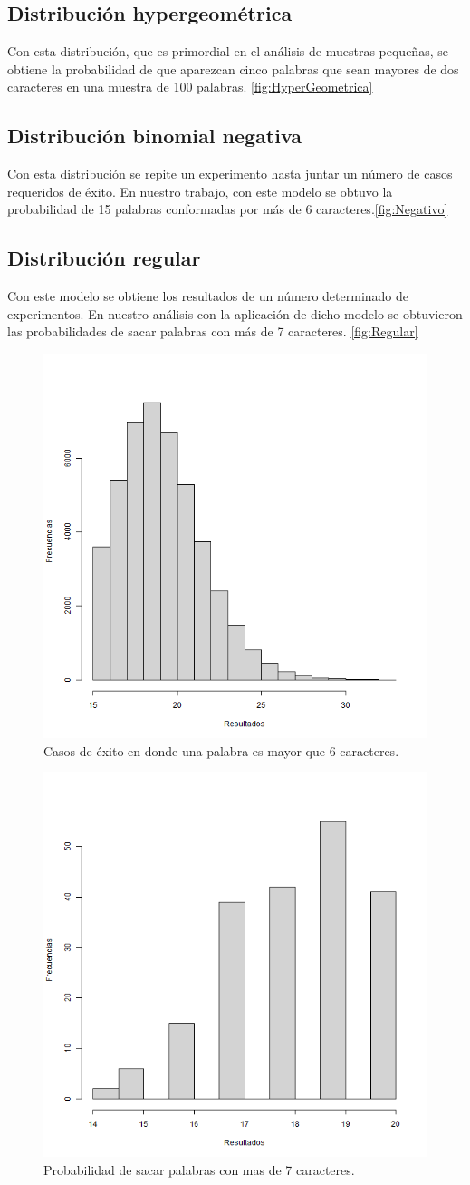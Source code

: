 \documentclass[]{article}
\begin{document}
\subsection{Distribución hypergeométrica}
Con esta distribución, que es primordial en el análisis de muestras pequeñas, se obtiene la probabilidad de que aparezcan cinco palabras que sean mayores de dos caracteres en una muestra de 100 palabras. \autoref{fig:HyperGeometrica}

\subsection{Distribución binomial negativa}
Con esta distribución se repite un experimento hasta juntar un número de casos requeridos de éxito. En nuestro trabajo, con este modelo se obtuvo la probabilidad de 15 palabras conformadas por más de 6 caracteres.\autoref{fig:Negativo}
\subsection{Distribución regular}
Con este modelo se obtiene los resultados de un número determinado de experimentos. En nuestro análisis con la aplicación de dicho modelo se obtuvieron las probabilidades de sacar palabras con más de 7 caracteres. \autoref{fig:Regular}

\begin{figure}[b]
    \centering
    \includegraphics[width=.5\linewidth]{Negativo.png}    \caption{Casos de éxito en donde una palabra es mayor que 6 caracteres.}
    \label{fig:Negativo}
\end{figure}
\begin{figure}[b]
    \centering
    \includegraphics[width=.5\linewidth]{Regular.png}    \caption{Probabilidad de sacar palabras con mas de 7 caracteres.}
    \label{fig:Regular}
\end{figure}


\printbibliography[title={Referencias}]
\end{document}
